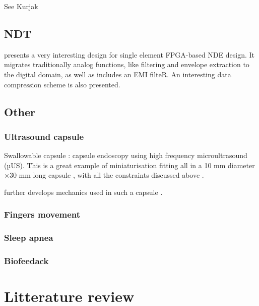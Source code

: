 \documentclass[conference]{IEEEtran}
\begin{document}
See Kurjak


\subsection{NDT}



\cite{fritsch_full_nodate} presents a very interesting design for single element FPGA-based NDE design. It migrates traditionally analog functions, like filtering and envelope extraction to   the   digital   domain, as well as includes an EMI filteR. An interesting data compression scheme is also presented.

\subsection{Other}

\subsubsection{Ultrasound capsule}

Swallowable capsule : capsule endoscopy using  high frequency microultrasound (µUS). This is a great example of miniaturisation fitting all in a  10 mm diameter ×30 mm long capsule , with all the constraints discussed above \cite{cox_ultrasound_2017}.

further develops mechanics used in such a capsule \cite{wang_development_2017}.

\subsubsection{Fingers movement}

\cite{sikdar_novel_2014}

\subsubsection{Sleep apnea}


\cite{weng_fpga-based_2015}

\subsubsection{Biofeedack}


 
\section{Litterature review}
\end{document}
